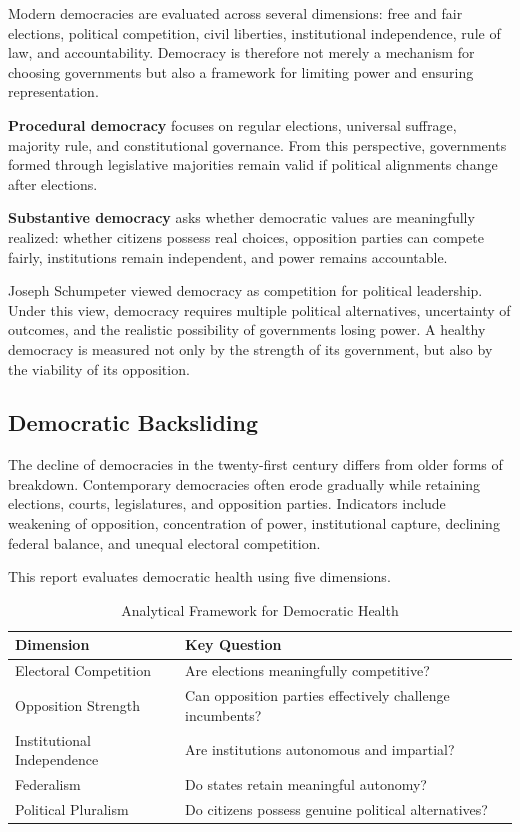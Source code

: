 \documentclass[11pt]{article}
\begin{document}
Modern democracies are evaluated across several dimensions: free and fair elections, political competition, civil liberties, institutional independence, rule of law, and accountability. Democracy is therefore not merely a mechanism for choosing governments but also a framework for limiting power and ensuring representation.

\textbf{Procedural democracy} focuses on regular elections, universal suffrage, majority rule, and constitutional governance. From this perspective, governments formed through legislative majorities remain valid if political alignments change after elections.

\textbf{Substantive democracy} asks whether democratic values are meaningfully realized: whether citizens possess real choices, opposition parties can compete fairly, institutions remain independent, and power remains accountable.

Joseph Schumpeter viewed democracy as competition for political leadership. Under this view, democracy requires multiple political alternatives, uncertainty of outcomes, and the realistic possibility of governments losing power. A healthy democracy is measured not only by the strength of its government, but also by the viability of its opposition.

\subsection{Democratic Backsliding}
The decline of democracies in the twenty-first century differs from older forms of breakdown. Contemporary democracies often erode gradually while retaining elections, courts, legislatures, and opposition parties. Indicators include weakening of opposition, concentration of power, institutional capture, declining federal balance, and unequal electoral competition.

This report evaluates democratic health using five dimensions.

\begin{table}[h]
\centering
\caption{Analytical Framework for Democratic Health}
\begin{tabularx}{\textwidth}{lX}
\toprule
Dimension & Key Question\\
\midrule
Electoral Competition & Are elections meaningfully competitive?\\
Opposition Strength & Can opposition parties effectively challenge incumbents?\\
Institutional Independence & Are institutions autonomous and impartial?\\
Federalism & Do states retain meaningful autonomy?\\
Political Pluralism & Do citizens possess genuine political alternatives?\\
\bottomrule
\end{tabularx}
\end{table}
\end{document}
